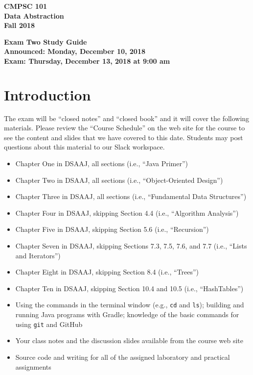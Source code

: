 \documentclass[11pt]{article}
\newcommand{\assignmentduedate}{December 13}
\newcommand{\assignmentassignedate}{December 10}
\newcommand{\assignmentnumber}{Two}
\newcommand{\labyear}{2018}
\newcommand{\assignedday}{Monday}
\newcommand{\dueday}{Thursday}
\newcommand{\labtime}{9:00 am}
\newcommand{\assigneddate}{Announced: \assignedday, \assignmentassignedate, \labyear{}}
\newcommand{\duedate}{Exam: \dueday, \assignmentduedate, \labyear{} at \labtime{}}
\newcommand{\program}[1]{\lstinline{#1}}
\newcommand{\guidetitle}[1]
{
  \begin{center}
    \begin{center}
      \bf
      CMPSC 101\\Data Abstraction\\
      Fall 2018\\
      \medskip
    \end{center}
    \bf
    #1
  \end{center}
}
\begin{document}
\thispagestyle{empty}

\guidetitle{Exam \assignmentnumber{} Study Guide \\ \assigneddate{} \\ \duedate{}}

\section*{Introduction}

\noindent
The exam will be ``closed notes'' and ``closed book'' and it will cover the
following materials. Please review the ``Course Schedule'' on the web site for
the course to see the content and slides that we have covered to this date.
Students may post questions about this material to our Slack workspace.

\begin{itemize}

  \itemsep 0in

  \item Chapter One in DSAAJ, all sections (i.e., ``Java Primer'')

  \item Chapter Two in DSAAJ, all sections (i.e., ``Object-Oriented Design'')

  \item Chapter Three in DSAAJ, all sections (i.e., ``Fundamental Data Structures'')

  \item Chapter Four in DSAAJ, skipping Section 4.4 (i.e., ``Algorithm Analysis'')

  \item Chapter Five in DSAAJ, skipping Section 5.6 (i.e., ``Recursion'')

  \item Chapter Seven in DSAAJ, skipping Sections 7.3, 7.5, 7.6, and 7.7 (i.e.,
    ``Lists and Iterators'')

  \item Chapter Eight in DSAAJ, skipping Section 8.4 (i.e., ``Trees'')

  \item Chapter Ten in DSAAJ, skipping Section 10.4 and 10.5 (i.e., ``HashTables'')

  \item Using the commands in the terminal window (e.g., \program{cd} and
    \program{ls}); building and running Java programs with Gradle; knowledge of
    the basic commands for using \program{git} and GitHub

  \item Your class notes and the discussion slides available from the course web
    site

  \item Source code and writing for all of the assigned laboratory and practical
    assignments

\end{itemize}
\end{document}
